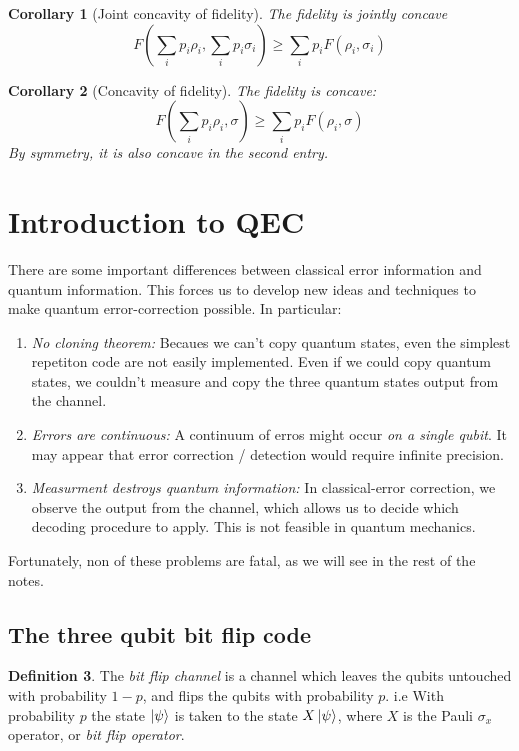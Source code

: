 \documentclass[11pt,a4paper]{article}
\theoremstyle{definition}
\newtheorem{definition}{Definition}[section]
\theoremstyle{plain}
\newtheorem{corollary}[definition]{Corollary}
\theoremstyle{remark}
\begin{document}
\begin{corollary}[Joint concavity of fidelity] \label{thm:joint-concavity-fidelity}
  The fidelity is \emph{jointly concave}
  $$F\left(\sum_i p_i \rho_i, \sum_i p_i \sigma_i\right) \geq \sum_i p_i F(\rho_i, \sigma_i)$$
\end{corollary}

\begin{corollary}[Concavity of fidelity] \label{thm:concavity-fidelity}
  The fidelity is concave: 
  $$F\left(\sum_i p_i \rho_i, \sigma\right) \geq \sum_i p_i F(\rho_i, \sigma)$$
  By symmetry, it is also concave in the second entry.
\end{corollary}
\section{Introduction to QEC}
There are some important differences between classical error information and quantum information. 
This forces us to develop new ideas and techniques to make quantum error-correction possible. In particular: 
\begin{enumerate}
  \item \emph{No cloning theorem:} Becaues we can't copy quantum states, even the simplest repetiton code are not easily implemented. 
  Even if we could copy quantum states, we couldn't measure and copy the three quantum states output from the channel. 

  \item \emph{Errors are continuous:} A continuum of erros might occur \emph{on a single qubit}. It may appear that error correction / detection 
  would require infinite precision. 

  \item \emph{Measurment destroys quantum information:} In classical-error correction, we observe the output from the channel, which allows us to 
  decide which decoding procedure to apply. This is not feasible in quantum mechanics. 
\end{enumerate}
Fortunately, non of these problems are fatal, as we will see in the rest of the notes. 

\subsection{The three qubit bit flip code}

\begin{definition}
  The \emph{bit flip channel} is a channel which leaves the qubits untouched with probability $1 - p$, and flips the qubits with probability $p$. 
 i.e With probability $p$ the state $\ket{\psi}$ is taken to the state $X \ket{\psi}$, where $X$ is the Pauli $\sigma_x$ operator, or \emph{bit flip operator}. 
\end{definition}
\end{document}
